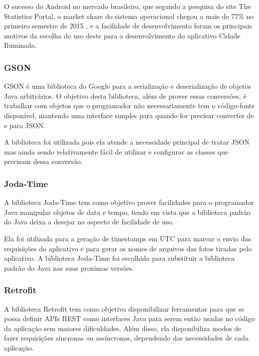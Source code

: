 \documentclass[
	article,			%
	11pt,				%
	oneside,			%
	a4paper,			%
	english,			%
	brazil,				%
	sumario=tradicional
	]{abntex2}
\begin{document}
O sucesso do Android no mercado brasileiro, que segundo a pesquisa do site The Statistics Portal, o market share do sistema operacional chegou a mais de 77\% no primeiro semestre de 2015 \cite{statista}, e a facilidade de desenvolvimento foram os principais motivos da escolha do uso deste para o desenvolvimento do aplicativo Cidade Iluminada.

\subsubsection{GSON}

GSON é uma biblioteca do Google para a serialização e deserialização de objetos Java arbitrários.
O objetivo desta biblioteca, além de prover essas conversões, é trabalhar com objetos que o programador não necessariamente tem o código-fonte disponível, mantendo uma interface simples para quando for precisar converter de e para JSON. \cite{gson}

A biblioteca foi utilizada pois ela atende a necessidade principal de tratar JSON mas ainda sendo relativamente fácil de utilizar e configurar as classes que precisam dessa conversão.

\subsubsection{Joda-Time}

A biblioteca Joda-Time tem como objetivo prover facilidades para o programador Java manipular objetos de data e tempo, tendo em vista que a biblioteca padrão do Java deixa a desejar no aspecto de facilidade de uso.

Ela foi utilizada para a geração de timestamps em UTC para marcar o envio das requisições do aplicativo e para gerar os nomes de arquivos das fotos tiradas pelo aplicativo.
A biblioteca Joda-Time foi escolhida para substituir a biblioteca padrão do Java nas suas proximas versões.\cite{jodatime}

\subsubsection{Retrofit}

A biblioteca Retrofit tem como objetivo disponibilizar ferramentas para que se possa definir APIs REST como interfaces Java para serem então usadas no código da aplicação sem maiores dificuldades.
Além disso, ela disponibiliza modos de fazer requisições síncronas ou assíncronas, dependendo das necessidades de cada aplicação.\cite{retrofit}
\end{document}
